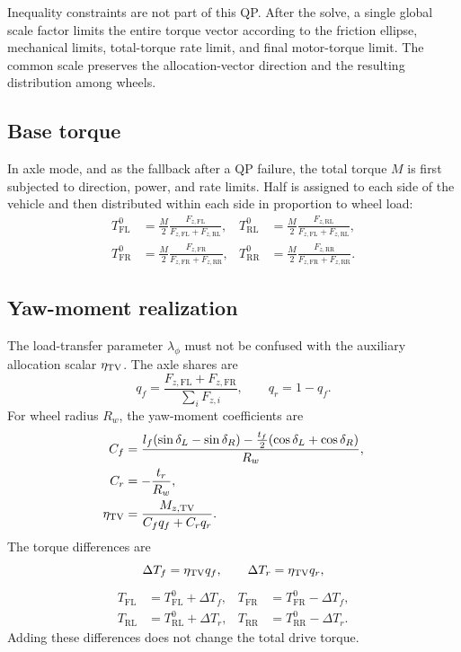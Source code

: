 \documentclass[11pt,a4paper]{article}
\newcommand{\FL}{\mathrm{FL}}
\newcommand{\FR}{\mathrm{FR}}
\newcommand{\RL}{\mathrm{RL}}
\newcommand{\RR}{\mathrm{RR}}
\begin{document}
Inequality constraints are not part of this QP. After the solve, a single
global scale factor limits the entire torque vector according to the friction
ellipse, mechanical limits, total-torque rate limit, and final motor-torque
limit. The common scale preserves the allocation-vector direction and the
resulting distribution among wheels.

\subsection{Base torque}

In axle mode, and as the fallback after a QP failure, the total torque $M$ is
first subjected to direction, power, and rate limits. Half is assigned to
each side of the vehicle and then distributed within each side in proportion
to wheel load:
\begin{align}
T_\FL^0&=\frac{M}{2}\frac{F_{z,\FL}}{F_{z,\FL}+F_{z,\RL}},&
T_\RL^0&=\frac{M}{2}\frac{F_{z,\RL}}{F_{z,\FL}+F_{z,\RL}},\\
T_\FR^0&=\frac{M}{2}\frac{F_{z,\FR}}{F_{z,\FR}+F_{z,\RR}},&
T_\RR^0&=\frac{M}{2}\frac{F_{z,\RR}}{F_{z,\FR}+F_{z,\RR}}.
\end{align}

\subsection{Yaw-moment realization}

The load-transfer parameter $\lambda_\phi$ must not be confused with the
auxiliary allocation scalar $\eta_{\rm TV}$. The axle shares are
\begin{equation}
q_f=\frac{F_{z,\FL}+F_{z,\FR}}{\sum_iF_{z,i}},
\qquad q_r=1-q_f.
\end{equation}
For wheel radius $R_w$, the yaw-moment coefficients are
\begin{align}
C_f&=\frac{
l_f(\sin\delta_L-\sin\delta_R)
-\frac{t_f}{2}(\cos\delta_L+\cos\delta_R)}{R_w},\\
C_r&=-\frac{t_r}{R_w},\\
\eta_{\rm TV}&=\frac{M_{z,\rm TV}}{C_fq_f+C_rq_r}.
\end{align}
The torque differences are
\begin{equation}
\Delta T_f=\eta_{\rm TV}q_f,\qquad
\Delta T_r=\eta_{\rm TV}q_r,
\end{equation}
\begin{align}
T_\FL&=T_\FL^0+\Delta T_f,&T_\FR&=T_\FR^0-\Delta T_f,\\
T_\RL&=T_\RL^0+\Delta T_r,&T_\RR&=T_\RR^0-\Delta T_r.
\end{align}
Adding these differences does not change the total drive torque.
\end{document}
